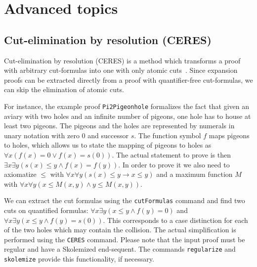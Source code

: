\documentclass[a4paper,11pt]{book}
\newcommand{\impl}{\to} %
\renewcommand{\land}{\wedge}
\renewcommand{\lor}{\vee}
\begin{document}
\chapter{Advanced topics}


\section{Cut-elimination by resolution (CERES)}\label{sec:ceres}

Cut-elimination by resolution (CERES) is a method which transforms a
proof with arbitrary cut-formulas into one with only atomic cuts~\cite{Baaz00CutElimination,Baaz2011}. Since
expansion proofs can be extracted directly from a proof with quantifier-free
cut-formulas, we can skip the elimination of atomic cuts.

For instance, the example proof \texttt{Pi2Pigeonhole} formalizes
the fact that given an aviary with two holes and an infinite number
of pigeons, one hole has to house at least two pigeons. The pigeons and
the holes are represented by numerals in unary notation with zero $0$ and
successor $s$. The function symbol $f$ maps pigeons to holes, which allows us
to state the mapping of pigeons to holes as
$\forall x (f(x) = 0 \lor f(x) = s(0))$. The actual statement to prove is then
$\exists x \exists y (s(x) \leq y \land f(x) = f(y))$. In order to prove it
we also need to axiomatize $\leq$ with
$\forall x \forall y (s(x) \leq y \impl x \leq y)$
and a maximum function $M$ with $\forall x \forall y (x \leq M(x,y) \land y\leq M(x,y))$.

We can extract the cut formulas using the \texttt{cutFormulas} command and find two
cuts on quantified formulas: $\forall x \exists y (x \leq y \land f(y) = 0)$
and $\forall x \exists y (x \leq y \land f(y) = s(0))$.
This corresponds to a case distinction for each of the two holes which may contain the collision.
The actual simplification is performed using the \texttt{CERES} command. Please note
that the input proof must be regular and have a Skolemized end-sequent.
The commands \texttt{regularize} and \texttt{skolemize} provide this functionality,
if necessary.
\end{document}
